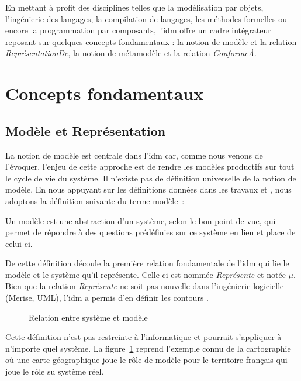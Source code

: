 En mettant à profit des disciplines telles que la modélisation par objets, 
l'ingénierie des langages, la compilation de langages, les méthodes formelles ou encore la programmation par composants, l'\gls{idm} offre un cadre intégrateur reposant 
sur quelques concepts fondamentaux : la notion de modèle et la relation 
\textit{ReprésentationDe}, la notion de métamodèle et la relation 
\textit{ConformeÀ}.

\section{Concepts fondamentaux}
\subsection{Modèle et Représentation}
La notion de modèle est centrale dans l'\gls{idm} car, comme nous venons de l'évoquer, 
l'enjeu de cette approche est de rendre les modèles productifs sur tout le cycle 
de vie du système. Il n'existe pas de définition universelle de la notion de 
modèle. En nous appuyant sur les définitions données dans les travaux 
\cite{minsky1967computation} \cite{bezivin2001towards} et 
\cite{seidewitz2003models}, nous adoptons la définition suivante du terme modèle~:


\begin{definition}
Un modèle est une abstraction d'un système, selon le bon point de vue, qui 
permet de répondre à des questions prédéfinies sur ce système en lieu et place 
de celui-ci.
\end{definition}

De cette définition découle la première relation fondamentale de l'\gls{idm} qui lie 
le modèle et le système qu'il représente. Celle-ci est nommée 
\textit{Représente} et notée $\mu$. Bien que la relation 
\textit{Représente} ne soit pas nouvelle dans l'ingénierie logicielle 
(Merise, UML), l'\gls{idm} a permis d'en définir les contours \cite{atkinson2003model} 
\cite{seidewitz2003models} \cite{bezivin2004search}.

\begin{figure}[!ht]
    \begin{center}
    
    \end{center}
    \caption{Relation entre système et modèle \protect\cite{favre2006ingenierie}}
    \label{fig:systemModele}
\end{figure}

Cette définition n'est pas restreinte à l'informatique et pourrait s'appliquer à 
n'importe quel système. 
La figure~\ref{fig:systemModele} reprend l'exemple connu de la cartographie où 
une carte géographique joue le rôle de modèle pour le territoire français qui joue le rôle su système réel.

